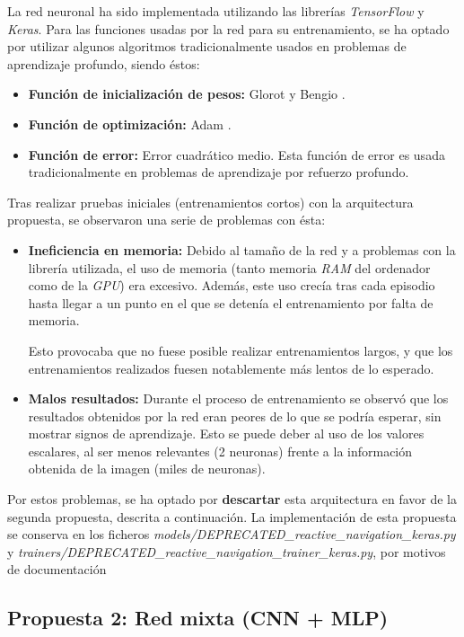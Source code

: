 La red neuronal ha sido implementada utilizando las librerías \textit{TensorFlow} y \textit{Keras}. Para las funciones usadas por la red para su entrenamiento, se ha optado por utilizar algunos algoritmos tradicionalmente usados en problemas de aprendizaje profundo, siendo éstos:
\begin{itemize}
	\item \textbf{Función de inicialización de pesos:} Glorot y Bengio \cite{Glorot2010UnderstandingTD}.
	\item \textbf{Función de optimización:} Adam \cite{adam2014}.
	\item \textbf{Función de error:} Error cuadrático medio. Esta función de error es usada tradicionalmente en problemas de aprendizaje por refuerzo profundo.
\end{itemize}

Tras realizar pruebas iniciales (entrenamientos cortos) con la arquitectura propuesta, se observaron una serie de problemas con ésta:

\begin{itemize}
	\item \textbf{Ineficiencia en memoria:} Debido al tamaño de la red y a problemas con la librería utilizada, el uso de memoria (tanto memoria \textit{RAM} del ordenador como de la \textit{GPU}) era excesivo. Además, este uso crecía tras cada episodio hasta llegar a un punto en el que se detenía el entrenamiento por falta de memoria.
	
	Esto provocaba que no fuese posible realizar entrenamientos largos, y que los entrenamientos realizados fuesen notablemente más lentos de lo esperado.
	\item \textbf{Malos resultados:} Durante el proceso de entrenamiento se observó que los resultados obtenidos por la red eran peores de lo que se podría esperar, sin mostrar signos de aprendizaje. Esto se puede deber al uso de los valores escalares, al ser menos relevantes (2 neuronas) frente a la información obtenida de la imagen (miles de neuronas).
\end{itemize}

Por estos problemas, se ha optado por \textbf{descartar} esta arquitectura en favor de la segunda propuesta, descrita a continuación. La implementación de esta propuesta se conserva en los ficheros \textit{models/DEPRECATED{\_}reactive{\_}navigation{\_}keras.py} y \textit{trainers/DEPRECATED{\_}reactive{\_}navigation{\_}trainer{\_}keras.py}, por motivos de documentación

\subsection{Propuesta 2: Red mixta (CNN + MLP)}

